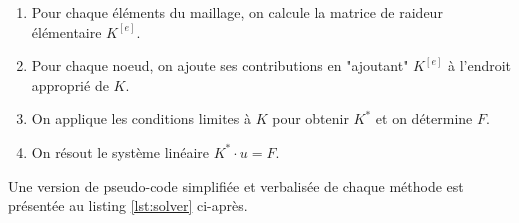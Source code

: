 \documentclass{article}
\begin{document}
\begin{enumerate}
    \item Pour chaque éléments du maillage,
    on calcule la matrice de raideur élémentaire $K^{[e]}$.
    \item Pour chaque noeud, on ajoute ses contributions en "ajoutant" $K^{[e]}$ à l'endroit approprié de $K$.
    \item On applique les conditions limites à $K$ pour obtenir $K^*$ et on détermine $F$.
    \item On résout le système linéaire $K^* \cdot u = F$.
\end{enumerate}

Une version de pseudo-code simplifiée et verbalisée de chaque méthode 
est présentée au listing \ref{lst:solver} ci-après.

\newpage
\end{document}
